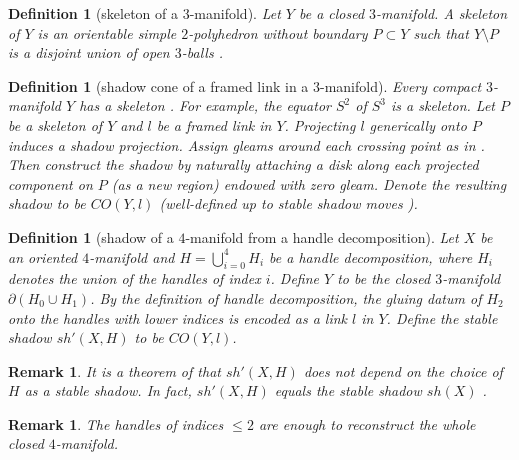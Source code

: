 \documentclass[12pt]{extarticle}
\numberwithin{equation}{section} %
\theoremstyle{mystyle}
\newtheorem{definition}[equation]{Definition}
\newtheorem{remark}[equation]{Remark}
\begin{document}
\begin{definition}[skeleton of a $3$-manifold]\label{def/skeleton-of-a-3-manifold}
  Let $Y$ be a closed $3$-manifold. A skeleton of $Y$ is an
  orientable simple $2$-polyhedron without boundary $P \subset Y$
  such that $Y \setminus P$ is a disjoint union of open
  $3$-balls \cite[p. 400]{turaev-qiok-3-manifolds}.
\end{definition}

\begin{definition}[shadow cone of a framed link in a
  $3$-manifold]\label{def/shadow-cone-of-a-framed-link-in-a-3-manifold}
  \noindent Every compact $3$-manifold $Y$ has a skeleton
  \cite[theorem IX 2.1.1]{turaev-qiok-3-manifolds}. For example,
  the equator $S^{2}$ of $S^{3}$ is a skeleton. Let $P$ be a
  skeleton of $Y$ and $l$ be a framed link in $Y$. Projecting $l$
  generically onto $P$ induces a shadow projection. Assign gleams
  around each crossing point as in \cite[figure
  IX.3.4]{turaev-qiok-3-manifolds}. Then construct the shadow by
  naturally attaching a disk along each projected component on
  $P$ (as a new region) endowed with zero gleam. Denote the
  resulting shadow to be $CO(Y,l)$ (well-defined up to stable
  shadow moves \cite[section IX.3.3]{turaev-qiok-3-manifolds}).
\end{definition}

\begin{definition}[shadow of a $4$-manifold from a handle
  decomposition]\label{def/shadow-of-a-4-manifold-from-a-handle-decomposition}
  Let $X$ be an oriented $4$-manifold and
  $H = \bigcup_{i=0}^{4} H_{i}$ be a handle decomposition, where
  $H_{i}$ denotes the union of the handles of index $i$. Define
  $Y$ to be the closed $3$-manifold $\partial(H_{0} \cup H_{1})$.
  By the definition of handle decomposition, the gluing datum of
  $H_{2}$ onto the handles with lower indices is encoded as a
  link $l$ in $Y$. Define the stable shadow $sh'(X,H)$ to be
  $CO(Y,l)$.
\end{definition}

\begin{remark}\label{remark/stable-shadow-of-a-4-manifold}
  It is a theorem of \cite[sec.IX.4.2]{turaev-qiok-3-manifolds}
  that $sh'(X,H)$ does not depend on the choice of $H$ as a
  stable shadow. In fact, $sh'(X,H)$ equals the stable shadow
  $sh(X)$ \cite[sec. IX.7]{turaev-qiok-3-manifolds}.
\end{remark}

\begin{remark}\label{remark/reconstruction-of-4-manifolds}\cite[section 4.4]{gompf-stipsicz/4-manifolds-and-kirby-calculus}
  The handles of indices $\leq 2$ are enough to reconstruct the
  whole closed $4$-manifold.
\end{remark}
\end{document}
